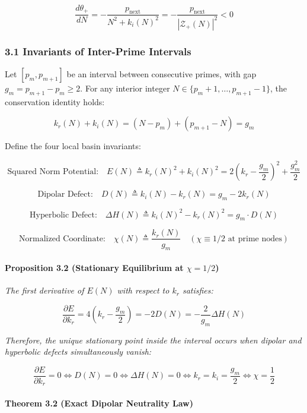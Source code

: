 \documentclass[
  11pt,
]{article}
\begin{document}
\[\frac{d\theta_+}{dN} = -\frac{p_{\text{next}}}{N^2 + k_i(N)^2} = -\frac{p_{\text{next}}}{|\mathcal{Z}_+(N)|^2} < 0\]

\subsubsection{3.1 Invariants of Inter-Prime
Intervals}\label{invariants-of-inter-prime-intervals}

Let \([p_m, p_{m+1}]\) be an interval between consecutive primes, with
gap \(g_m = p_{m+1} - p_m \ge 2\). For any interior integer
\(N \in \{p_m + 1, \dots, p_{m+1} - 1\}\), the conservation identity
holds:

\[k_r(N) + k_i(N) = (N - p_m) + (p_{m+1} - N) = g_m\]

Define the four local basin invariants:

\[\text{Squared Norm Potential:} \quad E(N) \triangleq k_r(N)^2 + k_i(N)^2 = 2\left(k_r - \frac{g_m}{2}\right)^2 + \frac{g_m^2}{2}\]

\[\text{Dipolar Defect:} \quad D(N) \triangleq k_i(N) - k_r(N) = g_m - 2k_r(N)\]

\[\text{Hyperbolic Defect:} \quad \Delta H(N) \triangleq k_i(N)^2 - k_r(N)^2 = g_m \cdot D(N)\]

\[\text{Normalized Coordinate:} \quad \chi(N) \triangleq \frac{k_r(N)}{g_m} \quad (\chi \equiv 1/2 \text{ at prime nodes})\]

\paragraph{\texorpdfstring{Proposition 3.2 (Stationary Equilibrium at
\(\chi = 1/2\))}{Proposition 3.2 (Stationary Equilibrium at \textbackslash chi = 1/2)}}\label{proposition-3.2-stationary-equilibrium-at-chi-12}

\emph{The first derivative of \(E(N)\) with respect to \(k_r\)
satisfies:}

\[\frac{\partial E}{\partial k_r} = 4\left(k_r - \frac{g_m}{2}\right) = -2 D(N) = -\frac{2}{g_m} \Delta H(N)\]

\emph{Therefore, the unique stationary point inside the interval occurs
when dipolar and hyperbolic defects simultaneously vanish:}

\[\frac{\partial E}{\partial k_r} = 0 \iff D(N) = 0 \iff \Delta H(N) = 0 \iff k_r = k_i = \frac{g_m}{2} \iff \boxed{\chi = \frac{1}{2}}\]

\paragraph{Theorem 3.2 (Exact Dipolar Neutrality
Law)}\label{theorem-3.2-exact-dipolar-neutrality-law}
\end{document}

